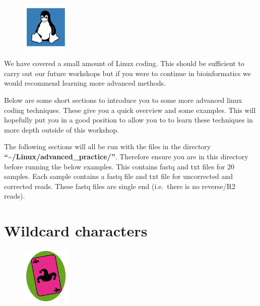 \documentclass[
  letterpaper,
  DIV=11,
  numbers=noendperiod]{scrreprt}
\begin{document}
\begin{figure}

{\centering \includegraphics[width=0.2\textwidth,height=\textheight]{figures/linux_intermdiary.png}

}

\end{figure}

We have covered a small amount of Linux coding. This should be
sufficient to carry out our future workshops but if you were to continue
in bioinformatics we would recommend learning more advanced methods.

Below are some short sections to introduce you to some more advanced
linux coding techniques. These give you a quick overview and some
examples. This will hopefully put you in a good position to allow you to
to learn these techniques in more depth outside of this workshop.

The following sections will all be run with the files in the directory
\textbf{``\textasciitilde/Linux/advanced\_practice/''}. Therefore ensure
you are in this directory before running the below examples. This
contains fastq and txt files for 20 samples. Each sample contains a
fastq file and txt file for uncorrected and corrected reads. These fastq
files are single end (i.e.~there is no reverse/R2 reads).

\hypertarget{wildcard-characters}{%
\section{Wildcard characters}\label{wildcard-characters}}

\begin{figure}

{\centering \includegraphics[width=0.2\textwidth,height=\textheight]{figures/wildcard.png}

}

\end{figure}
\end{document}
